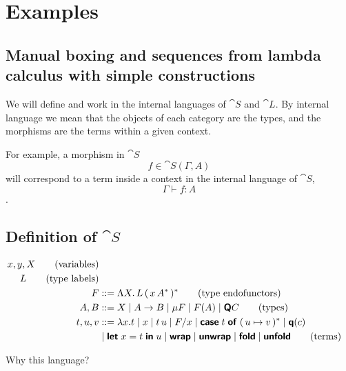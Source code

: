 \section{Examples}\label{sec:examples}

\subsection{Manual boxing and sequences from lambda calculus with simple constructions}

We will define and work in the internal languages of $\cat S$ and $\cat L$. By
internal language we mean that the objects of each category are the types, and
the morphisms are the terms within a given context.

For example, a morphism in $\cat S$ $$ f \in \cat S (\Gamma, A) $$ will
correspond to a term inside a context in the internal language of $\cat S$, $$
  \Gamma \vdash f : A $$.

\subsection{Definition of $\cat S$}

\begin{align*}
  x,y, X  \tag{variables}                                                                                            \\
  L  \tag{type labels}                                                                                               \\
  F       & ::= \Lambda X .  \, L \, (\, x \, A^* \,)^* \tag{type endofunctors}                                      \\
  A, B    & ::= X \mid A \to B \mid \mu F \mid F(A)  \mid \textsf{\textbf{Q}} C \tag{types}                                     \\
  t, u, v & ::= \lambda x . t \mid x \mid t\,u \mid F / x \mid \textsf{\textbf{case}}\; {t}\; \textsf{\textbf{of}}\; (\, {u} \mapsto {v} \,)^* \mid \textsf{\textbf{q}}(c)   \\
          & \mid \textsf{\textbf{let}}\; {x} = {t}\; \textsf{\textbf{in}}\; {u} \mid \textsf{\textbf{wrap}} \mid \textsf{\textbf{unwrap}} \mid \textsf{\textbf{fold}} \mid \textsf{\textbf{unfold}} \tag{terms}
\end{align*}

Why this language?

